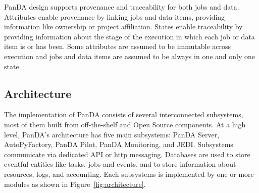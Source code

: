 PanDA design supports provenance and traceability for both jobs and data.
Attributes enable provenance by linking jobs and data items, providing
information like ownership or project affiliation. States enable traceability by
providing information about the stage of the execution in which each job or data
item is or has been. Some attributes are assumed to be immutable across
execution and jobs and data items are assumed to be always in one and only one
state.


\subsection{Architecture}
\label{ssec:panda_arch}

The implementation of PanDA consists of several interconnected subsystems, most
of them built from off-the-shelf and Open Source components. At a high level,
PanDA's architecture has five main subsystems: PanDA Server, AutoPyFactory,
PanDA Pilot, PanDA Monitoring, and JEDI. Subsystems communicate via dedicated
API or http messaging. Databases are used to store eventful entities like tasks,
jobs and events, and to store information about resources, logs, and accounting.
Each subsystems is implemented by one or more modules as shown in
Figure~\ref{fig:architecture}.



